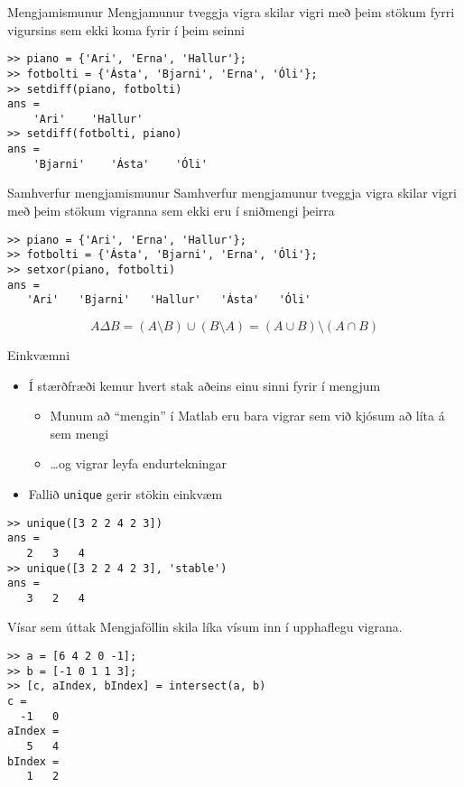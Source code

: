 \documentclass[handout]{beamer}
\begin{document}
\begin{frame}[fragile]{Mengjamismunur}
Mengjamunur tveggja vigra skilar vigri með þeim stökum fyrri vigursins sem ekki koma fyrir í þeim seinni
\begin{verbatim}
>> piano = {'Ari', 'Erna', 'Hallur'};
>> fotbolti = {'Ásta', 'Bjarni', 'Erna', 'Óli'};
>> setdiff(piano, fotbolti)
ans = 
    'Ari'    'Hallur'
>> setdiff(fotbolti, piano)
ans = 
    'Bjarni'    'Ásta'    'Óli'
\end{verbatim}

\end{frame}

\begin{frame}[fragile]{Samhverfur mengjamismunur}
Samhverfur mengjamunur tveggja vigra skilar vigri með þeim stökum vigranna sem ekki eru í sniðmengi þeirra
\begin{verbatim}
>> piano = {'Ari', 'Erna', 'Hallur'};
>> fotbolti = {'Ásta', 'Bjarni', 'Erna', 'Óli'};
>> setxor(piano, fotbolti)
ans = 
   'Ari'   'Bjarni'   'Hallur'   'Ásta'   'Óli'
\end{verbatim}
\[
A \Delta B = (A \setminus B) \cup (B \setminus A) = (A \cup B) \setminus (A \cap B)
\]
\end{frame}

\begin{frame}[fragile]{Einkvæmni}
\begin{itemize}
 \item Í stærðfræði kemur hvert stak aðeins einu sinni fyrir í mengjum
 \begin{itemize}
  \item Munum að ``mengin'' í Matlab eru bara vigrar sem við kjósum að líta á sem mengi
  \item \ldots og vigrar leyfa endurtekningar
 \end{itemize}
 \item Fallið \texttt{unique} gerir stökin einkvæm
\end{itemize}
\begin{verbatim}
>> unique([3 2 2 4 2 3])
ans =
   2   3   4
>> unique([3 2 2 4 2 3], 'stable')
ans =
   3   2   4
\end{verbatim}
\end{frame}

\begin{frame}[fragile]{Vísar sem úttak}
Mengjaföllin skila líka vísum inn í upphaflegu vigrana.
\begin{verbatim}
>> a = [6 4 2 0 -1];     
>> b = [-1 0 1 1 3];
>> [c, aIndex, bIndex] = intersect(a, b)
c =
  -1   0
aIndex =
   5   4
bIndex =
   1   2
\end{verbatim}
\end{frame}
\end{document}
